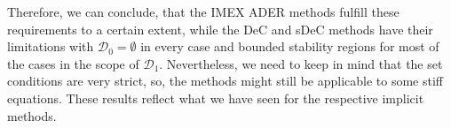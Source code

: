 Therefore, we can conclude, that the IMEX ADER methods fulfill these requirements to a certain  extent, while the DeC and sDeC methods have their limitations with $\mathcal{D}_0= \emptyset$ in every case and bounded stability regions for most of the cases in the scope of $\mathcal{D}_1$. Nevertheless, we need to keep in mind that the set conditions are very strict, so,  the methods might still be applicable to some stiff equations. %
These results reflect what we have seen for the respective implicit methods.
 